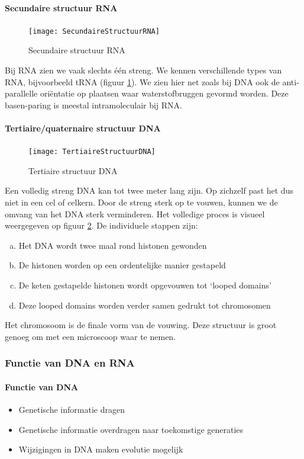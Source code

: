 \documentclass[a4paper,kul]{kulakarticle} %
\begin{document}
\paragraph{Secundaire structuur RNA}
\begin{figure}[h]
	\centering
	\texttt{[image: SecundaireStructuurRNA]}
	\caption[Secundaire structuur RNA]{Secundaire structuur RNA}
	\label{fig:secundairestructuurrna}
\end{figure}
\noindent
Bij RNA zien we vaak slechts één streng. We kennen verschillende types van RNA, bijvoorbeeld tRNA (figuur \ref{fig:secundairestructuurrna}). We zien hier net zoals bij DNA ook de anti-parallelle oriëntatie op plaatsen waar waterstofbruggen gevormd worden. Deze basen-paring is meestal intramoleculair bij RNA. 
\newpage
\paragraph{Tertiaire/quaternaire structuur DNA}
\begin{figure}[h]
	\centering
	\texttt{[image: TertiaireStructuurDNA]}
	\caption[Tertiaire structuur DNA]{Tertiaire structuur DNA}
	\label{fig:tertiairestructuurdna}
\end{figure}
\noindent
Een volledig streng DNA kan tot twee meter lang zijn. Op zichzelf past het dus niet in een cel of celkern. Door de streng sterk op te vouwen, kunnen we de omvang van het DNA sterk verminderen. Het volledige proces is visueel weergegeven op figuur \ref{fig:tertiairestructuurdna}. De individuele stappen zijn:
\begin{enumerate}[a)] 
	\item Het DNA wordt twee maal rond histonen gewonden 
	\item De histonen worden op een ordentelijke manier gestapeld
	\item De keten gestapelde histonen wordt opgevouwen tot `looped domains'
	\item Deze looped domains worden verder samen gedrukt tot chromosomen
\end{enumerate}
Het chromosoom is de finale vorm van de vouwing. Deze structuur is groot genoeg om met een microscoop waar te nemen. 
\newpage
\subsubsection{Functie van DNA en RNA}
\paragraph{Functie van DNA}
\begin{itemize}
	\item Genetische informatie dragen
	\item Genetische informatie overdragen naar toekomstige generaties
	\item Wijzigingen in DNA maken evolutie mogelijk
\end{itemize}
\end{document}
